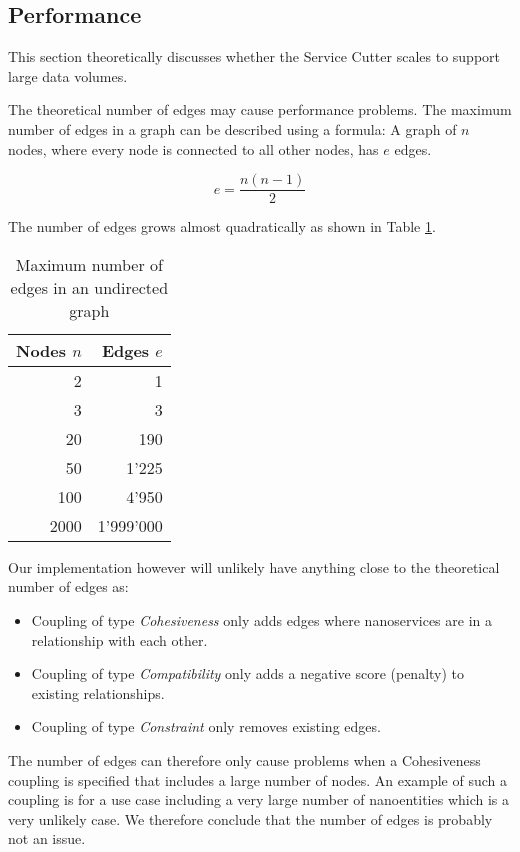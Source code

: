 \subsection{Performance}
\label{app:performance}

This section theoretically discusses whether the Service Cutter scales to support large data volumes.

The theoretical number of edges may cause performance problems. The maximum number of edges in a graph can be described using a formula: A graph of $n$ nodes, where every node is connected to all other nodes, has $e$ edges.

\begin{displaymath}
e = \frac{n(n-1)}{2}
\end{displaymath}

The number of edges grows almost quadratically as shown in Table \ref{tab:edgesCount}.

\begin{table}[H]
	\centering
	\caption{Maximum number of edges in an undirected graph}
	\label{tab:edgesCount}
	\begin{tabular}{|r|r|}
		\hline \textbf{Nodes} $n$ & \textbf{Edges} $e$ \\ 
		\hline 2 & 1 \\ 
		\hline 3 & 3 \\ 
		\hline 20 & 190 \\ 
		\hline 50 & 1'225 \\ 
		\hline 100 & 4'950 \\ 
		\hline 2000 & 1'999'000 \\ 
		\hline 
	\end{tabular} 
\end{table}

Our implementation however will unlikely have anything close to the theoretical number of edges as:
\begin{itemize}
	\item Coupling of type \textit{Cohesiveness} only adds edges where nanoservices are in a relationship with each other.
	\item Coupling of type \textit{Compatibility} only adds a negative score (penalty) to existing relationships.
	\item Coupling of type \textit{Constraint} only removes existing edges.
\end{itemize}

The number of edges can therefore only cause problems when a Cohesiveness coupling is specified that includes a large number of nodes. An example of such a coupling is for a use case including a very large number of nanoentities which is a very unlikely case. We therefore conclude that the number of edges is probably not an issue.
